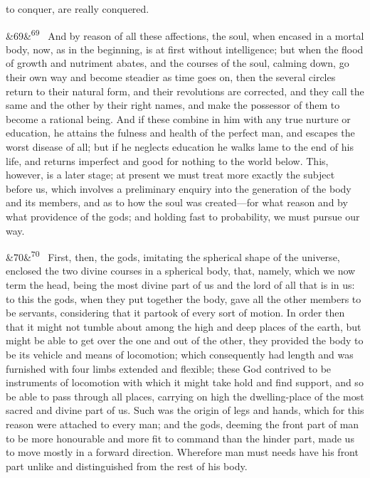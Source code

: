 \documentclass[12pt]{article}
\newcommand{\para}[1][]{\par\noindent\ifx&#1&\else\textsuperscript{\footnotesize #1}~\fi}
\begin{document}
to conquer, are really conquered.

\para[69] And by reason of all these affections, the soul, when encased in a mortal body, now, as in the beginning, is at first without intelligence; but when the flood of growth and nutriment abates, and the courses of the soul, calming down, go their own way and become steadier as time goes on, then the several circles return to their natural form, and their revolutions are corrected, and they call the same and the other by their right names, and make the possessor of them to become a rational being. And if these combine in him with any true nurture or education, he attains the fulness and health of the perfect man, and escapes the worst disease of all; but if he neglects education he walks lame to the end of his life, and returns imperfect and good for nothing to the world below. This, however, is a later stage; at present we must treat more exactly the subject before us, which involves a preliminary enquiry into the generation of the body and its members, and as to how the soul was created---for what reason and by what providence of the gods; and holding fast to probability, we must pursue our way.

\para[70] First, then, the gods, imitating the spherical shape of the universe, enclosed the two divine courses in a spherical body, that, namely, which we now term the head, being the most divine part of us and the lord of all that is in us: to this the gods, when they put together the body, gave all the other members to be servants, considering that it partook of every sort of motion. In order then that it might not tumble about among the high and deep places of the earth, but might be able to get over the one and out of the other, they provided the body to be its vehicle and means of locomotion; which consequently had length and was furnished with four limbs extended and flexible; these God contrived to be instruments of locomotion with which it might take hold and find support, and so be able to pass through all places, carrying on high the dwelling-place of the most sacred and divine part of us. Such was the origin of legs and hands, which for this reason were attached to every man; and the gods, deeming the front part of man to be more honourable and more fit to command than the hinder part, made us to move mostly in a forward direction. Wherefore man must needs have his front part unlike and distinguished from the rest of his body.
\end{document}
